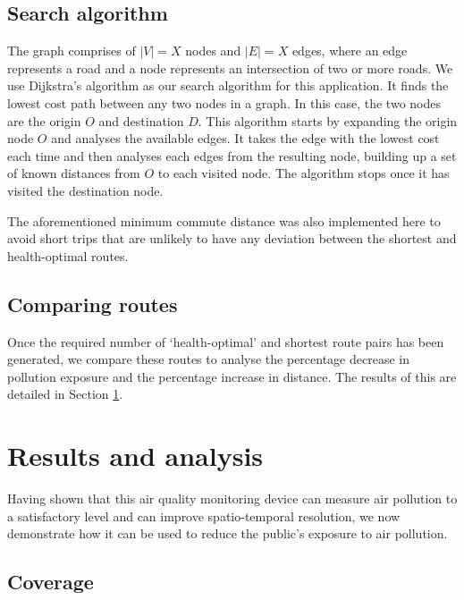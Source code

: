 \documentclass[11pt]{report}
\begin{document}
\subsection{Search algorithm}

The graph comprises of $|V| = X$ nodes and $|E| = X$ edges, where an edge represents a road and a node represents an intersection of two or more roads. We use Dijkstra's algorithm \citep{dijkstra1959} as our search algorithm for this application. It finds the lowest cost path between any two nodes in a graph. In this case, the two nodes are the origin $O$ and destination $D$. This algorithm starts by expanding the origin node $O$ and analyses the available edges. It takes the edge with the lowest cost each time and then analyses each edges from the resulting node, building up a set of known distances from $O$ to each visited node. The algorithm stops once it has visited the destination node.

The aforementioned minimum commute distance was also implemented here to avoid short trips that are unlikely to have any deviation between the shortest and health-optimal routes.


\subsection{Comparing routes}

Once the required number of `health-optimal' and shortest route pairs has been generated, we compare these routes to analyse the percentage decrease in pollution exposure and the percentage increase in distance. The results of this are detailed in Section \ref{results:q3}.


\section{Results and analysis} \label{results:q3}

Having shown that this air quality monitoring device can measure air pollution to a satisfactory level and can improve spatio-temporal resolution, we now demonstrate how it can be used to reduce the public's exposure to air pollution.

\subsection{Coverage}
\end{document}
